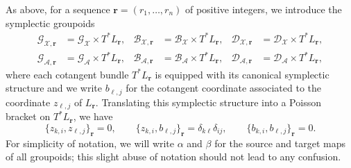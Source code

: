 \documentclass{amsart}
\numberwithin{equation}{section}
\newcommand{\bfr}{{\boldsymbol{r}}}
\newcommand{\cA}{\mathcal{A}}
\newcommand{\cB}{\mathcal{B}}
\newcommand{\cD}{\mathcal{D}}
\newcommand{\cG}{\mathcal{G}}
\newcommand{\cX}{\mathcal{X}}
\begin{document}
As above, for a sequence $\bfr=(r_1,\ldots,r_n)$ of positive integers, we introduce the symplectic groupoids 
\begin{align*}
  \cG_{\cX,\bfr}&=\cG_\cX\times T^*L_\bfr,& \cB_{\cX,\bfr}&=\cB_\cX\times T^*L_\bfr,& \cD_{\cX,\bfr}&=\cD_\cX\times T^*L_\bfr,\\
  \cG_{\cA,\bfr}&=\cG_\cA\times T^*L_\bfr,& \cB_{\cA,\bfr}&=\cB_\cA\times T^*L_\bfr,& \cD_{\cA,\bfr}&=\cD_\cA\times T^*L_\bfr,
\end{align*}
where each cotangent bundle $T^*L_\bfr$ is equipped with its canonical symplectic structure and we write $b_{\ell,j}$ for the cotangent coordinate associated to the coordinate $z_{\ell,j}$ of $L_\bfr$.
Translating this symplectic structure into a Poisson bracket on $T^*L_\bfr$, we have
\begin{equation}
  \label{eq:canonical brackets}
  \{z_{k,i},z_{\ell,j}\}_\bfr=0,\qquad\{z_{k,i},b_{\ell,j}\}_\bfr=\delta_{k\ell}\delta_{ij},\qquad\{b_{k,i},b_{\ell,j}\}_\bfr=0.
\end{equation}
For simplicity of notation, we will write $\alpha$ and $\beta$ for the source and target maps of all groupoids; this slight abuse of notation should not lead to any confusion.

\end{document}
